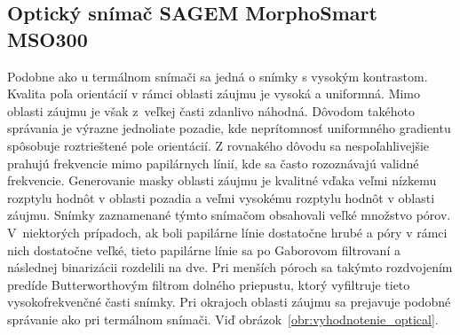   \subsection{Optický snímač SAGEM MorphoSmart MSO300}
  Podobne ako u termálnom snímači sa jedná o snímky s vysokým kontrastom. Kvalita poľa orientácií v rámci oblasti záujmu je vysoká a uniformná. Mimo oblasti
  záujmu je však z~veľkej časti zdanlivo náhodná. Dôvodom takéhoto správania je výrazne jednoliate pozadie, kde neprítomnosť uniformného gradientu spôsobuje
  roztrieštené pole orientácií. Z rovnakého dôvodu sa nespoľahlivejšie prahujú frekvencie mimo papilárnych línií, kde sa často rozoznávajú validné frekvencie.
  Generovanie masky oblasti záujmu je kvalitné vďaka veľmi nízkemu rozptylu hodnôt v oblasti pozadia a veľmi vysokému rozptylu hodnôt
  v oblasti záujmu.
  Snímky zaznamenané týmto snímačom obsahovali veľké množstvo pórov. V~niektorých prípadoch, ak boli papilárne línie dostatočne hrubé a póry v rámci nich
  dostatočne veľké, tieto papilárne línie sa po Gaborovom filtrovaní a následnej binarizácii rozdelili na dve. Pri menších póroch sa takýmto rozdvojením
  predíde Butterworthovým filtrom dolného priepustu, ktorý vyfiltruje tieto vysokofrekvenčné časti snímky. Pri okrajoch oblasti záujmu sa prejavuje podobné
  správanie ako pri termálnom snímači.
  Viď obrázok~{\ref{obr:vyhodnotenie_optical}}.
